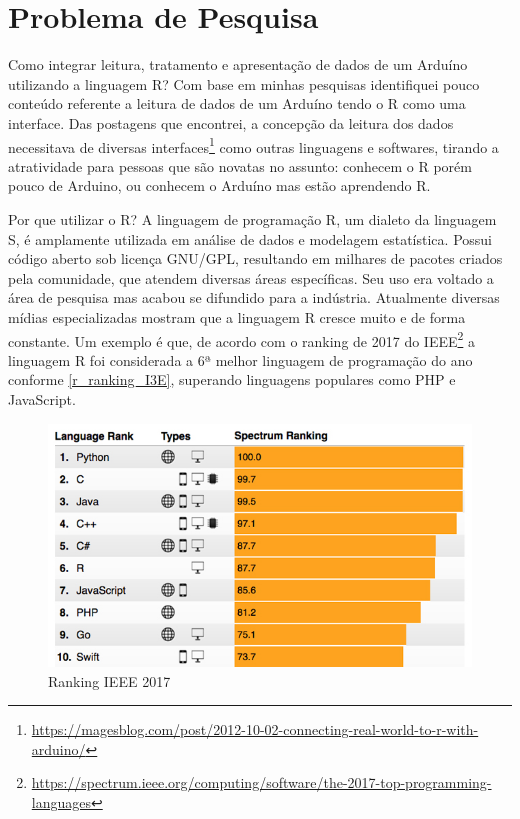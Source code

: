 \chapter*[Problema de Pesquisa]{Problema de Pesquisa}

Como integrar leitura, tratamento e apresentação de dados de um Arduíno 
utilizando a linguagem R? Com base em minhas pesquisas identifiquei 
pouco conteúdo referente a leitura de dados de um Arduíno tendo o R como uma
interface. Das postagens que encontrei, a concepção da leitura dos dados 
necessitava de diversas 
interfaces\footnote{\url{https://magesblog.com/post/2012-10-02-connecting-real-world-to-r-with-arduino/}}
como outras linguagens e softwares, tirando a atratividade para pessoas que são 
novatas no assunto: conhecem o R porém pouco de Arduino, ou conhecem o 
Arduíno mas estão aprendendo R.

Por que utilizar o R? A linguagem de programação R, um dialeto da linguagem 
S, é amplamente utilizada em análise de dados e modelagem estatística. Possui 
código aberto sob licença GNU/GPL, resultando em milhares de pacotes criados 
pela comunidade, que atendem diversas áreas específicas. Seu uso era voltado 
a área de pesquisa mas acabou se difundido para a indústria. Atualmente 
diversas mídias especializadas mostram que a linguagem R cresce muito e de 
forma constante. Um exemplo é que, de acordo com o ranking de 2017 do 
IEEE\footnote{\url{https://spectrum.ieee.org/computing/software/the-2017-top-programming-languages}}
a linguagem R foi considerada a 6ª melhor linguagem de programação do ano conforme 
\autoref{r_ranking_I3E}, superando linguagens populares como PHP e 
JavaScript.

\begin{figure}[htb]
 \caption{\label{r_ranking_I3E} Ranking IEEE 2017}
 \begin{center}
  \includegraphics[scale = 0.4]{img/r_ranking_I3E.jpeg}
 \end{center}
\end{figure}

